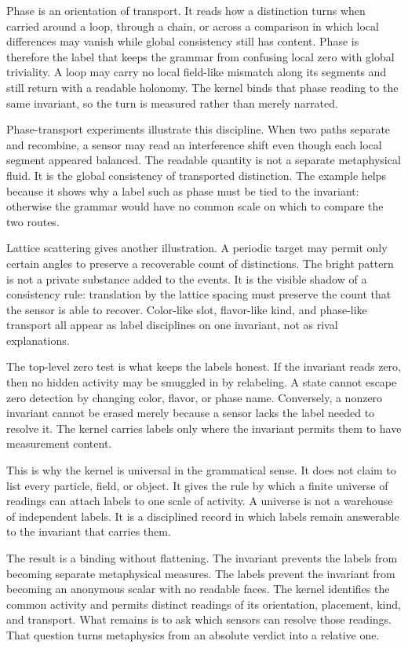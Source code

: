 Phase is an orientation of transport. It reads how a distinction turns when
carried around a loop, through a chain, or across a comparison in which local
differences may vanish while global consistency still has content. Phase is
therefore the label that keeps the grammar from confusing local zero with
global triviality. A loop may carry no local field-like mismatch along its
segments and still return with a readable holonomy. The kernel binds that
phase reading to the same invariant, so the turn is measured rather than
merely narrated.

Phase-transport experiments illustrate this discipline. When two paths
separate and recombine, a sensor may read an interference shift even though
each local segment appeared balanced. The readable quantity is not a
separate metaphysical fluid. It is the global consistency of transported
distinction. The example helps because it shows why a label such as phase
must be tied to the invariant: otherwise the grammar would have no common
scale on which to compare the two routes.

Lattice scattering gives another illustration. A periodic target may permit
only certain angles to preserve a recoverable count of distinctions. The
bright pattern is not a private substance added to the events. It is the
visible shadow of a consistency rule: translation by the lattice spacing
must preserve the count that the sensor is able to recover. Color-like slot,
flavor-like kind, and phase-like transport all appear as label disciplines
on one invariant, not as rival explanations.

The top-level zero test is what keeps the labels honest. If the invariant
reads zero, then no hidden activity may be smuggled in by relabeling. A
state cannot escape zero detection by changing color, flavor, or phase name.
Conversely, a nonzero invariant cannot be erased merely because a sensor
lacks the label needed to resolve it. The kernel carries labels only where
the invariant permits them to have measurement content.

This is why the kernel is universal in the grammatical sense. It does not
claim to list every particle, field, or object. It gives the rule by which a
finite universe of readings can attach labels to one scale of activity. A
universe is not a warehouse of independent labels. It is a disciplined
record in which labels remain answerable to the invariant that carries
them.

The result is a binding without flattening. The invariant prevents the
labels from becoming separate metaphysical measures. The labels prevent the
invariant from becoming an anonymous scalar with no readable faces. The
kernel identifies the common activity and permits distinct readings of its
orientation, placement, kind, and transport. What remains is to ask which
sensors can resolve those readings. That question turns metaphysics from an
absolute verdict into a relative one.
